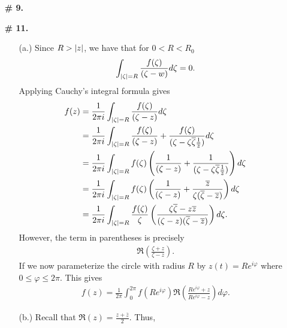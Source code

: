 \documentclass[a4paper,12pt]{article} %
\theoremstyle{plain}
\theoremstyle{definition}
\begin{document}
\begin{enumerate}
 \item[\textbf{\# 9.}]    
   \item[\textbf{\# 11.}] 
   \begin{itemize}
     \item[(a.)] Since $R >  \abs{z}$, we have that for $0 < R < R_0$
       \begin{align*}
         \int_{\abs{\zeta} = R} \frac{f(\zeta)}{(\zeta - w)} d \zeta = 0.
       \end{align*}
      Applying Cauchy's integral formula gives
      \begin{align*}
        f(z) &= \frac{1}{2 \pi i}\int_{\abs{\zeta} = R} \frac{f(\zeta)}{(\zeta - z)} d \zeta \\
             &= \frac{1}{2 \pi i}\int_{\abs{\zeta} = R} \frac{f(\zeta)}{(\zeta - z)} + \frac{f(\zeta)}{(\zeta - \zeta \overline{\zeta}\frac{1}{\overline{z}})} d \zeta \\
             &= \frac{1}{2 \pi i}\int_{\abs{\zeta} = R} f(\zeta)\left(\frac{1}{(\zeta - z)} + \frac{1}{(\zeta - \zeta \overline{\zeta}\frac{1}{\overline{z}})}\right) d \zeta \\
             &= \frac{1}{2 \pi i}\int_{\abs{\zeta} = R} f(\zeta)\left(\frac{1}{(\zeta - z)} + \frac{\overline{z}}{\zeta(\overline{\zeta} - \overline{z})}\right) d \zeta \\
             &= \frac{1}{2 \pi i}\int_{\abs{\zeta} = R} \frac{f(\zeta)}{\zeta}\left(\frac{\zeta \overline{\zeta} - z \overline{z}}{(\zeta - z)(\overline{\zeta} - \overline{z})} \right) d \zeta.
      \end{align*}
      However, the term in parentheses is precisely
      \begin{align*}
        \Re\left( \frac{\zeta + z}{\zeta - z} \right).
      \end{align*}
      If we now parameterize the circle with radius $R$ by $z(t) = Re^{i\varphi}$ where $0\le \varphi \le 2 \pi$.  This gives
      \begin{align*}
        f(z) = \frac{1}{2\pi} \int_0^{2\pi} f(Re^{i \varphi}) \Re\left( \frac{Re^{i\varphi} + z}{Re^{i\varphi} - z} \right) d\varphi.
      \end{align*}
     \item[(b.)] Recall that $\Re(z) = \frac{z + \overline{z}}{2}$.  Thus,

\end{itemize}
\end{enumerate}
\end{document}
